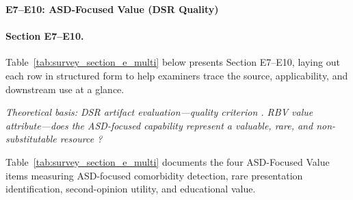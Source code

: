 \noindent\textbf{E7--E10: ASD-Focused Value (DSR Quality)}
\paragraph{Section E7--E10.}
\noindent Table~\ref{tab:survey_section_e_multi} below presents Section E7--E10, laying out each row in structured form to help examiners trace the source, applicability, and downstream use at a glance. %


\noindent\textit{Theoretical basis: DSR artifact evaluation---quality criterion \cite{hevner2004design}. RBV value attribute---does the ASD-focused capability represent a valuable, rare, and non-substitutable resource \cite{barney1991firm}?}

\noindent Table~\ref{tab:survey_section_e_multi} documents the four ASD-Focused Value items measuring ASD-focused comorbidity detection, rare presentation identification, second-opinion utility, and educational value.
